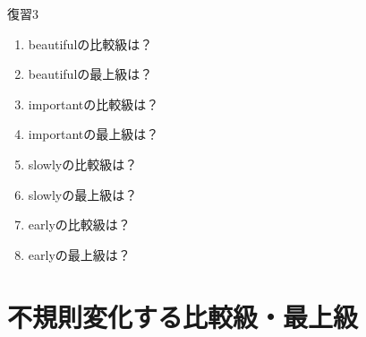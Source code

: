 \documentclass[aspectratio=169,xcolor={dvipsnames,table}]{beamer}
\begin{document}
\begin{frame}[plain]{復習3}
 
\begin{enumerate}
 \item beautifulの比較級は？\hfill{}
 \item beautifulの最上級は？\hfill{}
 \item importantの比較級は？\hfill{}
 \item importantの最上級は？\hfill{}
 \item slowlyの比較級は？\hfill{}
 \item slowlyの最上級は？\hfill{}
 \item earlyの比較級は？\hfill{}
 \item earlyの最上級は？\hfill{}
\end{enumerate}
\end{frame}
\section{不規則変化する比較級・最上級}
\end{document}
